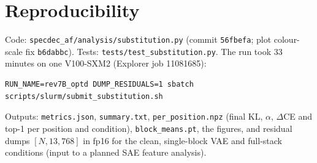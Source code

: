 \documentclass[11pt]{article}
\begin{document}
\section{Reproducibility}

Code: \texttt{specdec\_af/analysis/substitution.py} (commit \texttt{56fbefa}; plot colour-scale fix
\texttt{b6dabbc}). Tests: \texttt{tests/test\_substitution.py}. The run took 33 minutes on one V100-SXM2
(Explorer job 11081685):
\begin{verbatim}
RUN_NAME=rev7B_optd DUMP_RESIDUALS=1 sbatch scripts/slurm/submit_substitution.sh
\end{verbatim}
Outputs: \texttt{metrics.json}, \texttt{summary.txt}, \texttt{per\_position.npz} (final KL, $\alpha$, $\Delta$CE and top-1
per position and condition), \texttt{block\_means.pt}, the figures, and residual dumps
$[N, 13, 768]$ in fp16 for the clean, single-block VAE and full-stack conditions (input to a planned SAE feature
analysis).
\end{document}
